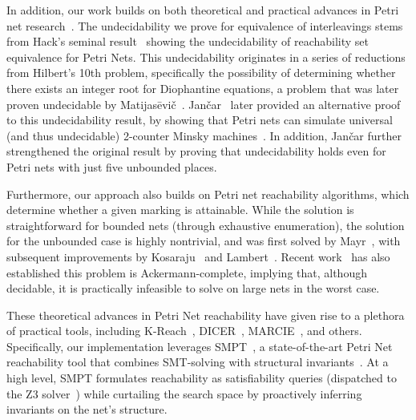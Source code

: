 
In addition, our work builds on both theoretical and practical advances in Petri net research~\cite{Mu89, Es96, Re12, EsNi24}. The undecidability we prove for equivalence of interleavings stems from Hack’s seminal result~\cite{Ha76, HaThesis76} showing the undecidability of reachability set equivalence for Petri Nets. This undecidability originates in a series of reductions from Hilbert’s 10th problem, specifically the possibility of determining whether there exists an integer root for Diophantine equations, a problem that was later proven undecidable by Matijasēvič~\cite{Ma70}.
%
Jančar~\cite{Ja95} later provided an alternative proof to this undecidability result, by showing that Petri nets can simulate universal (and thus undecidable) 2-counter Minsky machines~\cite{Mi67}. In addition, Jančar further strengthened the original result by proving that undecidability holds even for Petri nets with just five unbounded places.

Furthermore, our approach also builds on Petri net reachability algorithms, which determine whether a given marking is attainable. While the solution is straightforward for bounded nets (through exhaustive enumeration), the solution for the unbounded case is highly nontrivial, and was first solved by Mayr~\cite{Ma81}, with subsequent improvements by Kosaraju~\cite{Ko82} and Lambert~\cite{La92}. Recent work~\cite{CzWo22} has also established this problem is Ackermann-complete, implying that, although decidable, it is practically infeasible to solve on large nets in the worst case.

These theoretical advances in Petri Net reachability have given rise to a plethora of practical tools, including K-Reach~\cite{DiLa20}, DICER~\cite{XiZhLi21}, MARCIE~\cite{HeRoSc13}, and others. 
%
Specifically, our implementation leverages SMPT~\cite{AmDa23}, a state-of-the-art Petri Net reachability tool that combines SMT-solving with structural invariants~\cite{AmBeDa21, AmDaHu22}. At a high level, SMPT formulates reachability as satisfiability queries (dispatched to the Z3 solver~\cite{DeBj08}) while curtailing the search space by proactively inferring invariants on the net's structure.
%


